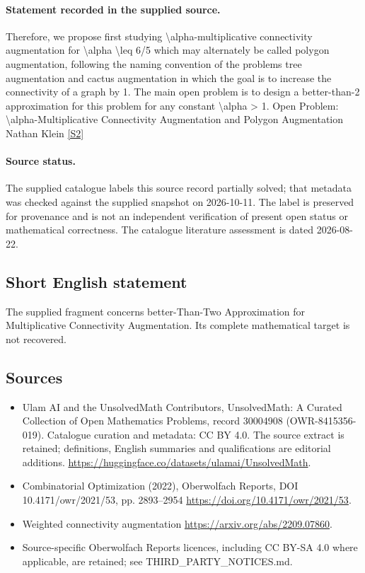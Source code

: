 \documentclass[11pt]{article}
\newcommand{\sref}[2]{\hyperlink{source:#1:#2}{[S#2]}}
\begin{document}
\paragraph{Statement recorded in the supplied source.}
Therefore, we propose first studying \textbackslash{}alpha-multiplicative connectivity augmentation for \textbackslash{}alpha \textbackslash{}leq 6/5 which may alternately be called polygon augmentation, following the naming convention of the problems tree augmentation and cactus augmentation in which the goal is to increase the connectivity of a graph by 1. The main open problem is to design a better-than-2 approximation for this problem for any constant \textbackslash{}alpha > 1. Open Problem: \textbackslash{}alpha-Multiplicative Connectivity Augmentation and Polygon Augmentation Nathan Klein \sref{30004908}{2}
\paragraph{Source status.}
The supplied catalogue labels this source record partially solved; that metadata was checked against the supplied snapshot on 2026-10-11. The label is preserved for provenance and is not an independent verification of present open status or mathematical correctness. The catalogue literature assessment is dated 2026-08-22.
\subsection{Short English statement}
The supplied fragment concerns better-Than-Two Approximation for Multiplicative Connectivity Augmentation. Its complete mathematical target is not recovered.
\subsection{Sources}
\begin{itemize}
\item[\hypertarget{source:30004908:1}{S1}] Ulam AI and the UnsolvedMath Contributors, UnsolvedMath: A Curated Collection of Open Mathematics Problems, record 30004908 (OWR-8415356-019). Catalogue curation and metadata: CC BY 4.0. The source extract is retained; definitions, English summaries and qualifications are editorial additions.
\url{https://huggingface.co/datasets/ulamai/UnsolvedMath}.
\item[\hypertarget{source:30004908:2}{S2}] Combinatorial Optimization (2022), Oberwolfach Reports, DOI 10.4171/owr/2021/53, pp. 2893--2954
\url{https://doi.org/10.4171/owr/2021/53}.
\item[\hypertarget{source:30004908:3}{S3}] Weighted connectivity augmentation
\url{https://arxiv.org/abs/2209.07860}.
\item Source-specific Oberwolfach Reports licences, including CC BY-SA 4.0 where applicable, are retained; see THIRD\_PARTY\_NOTICES.md.
\end{itemize}
\end{document}
